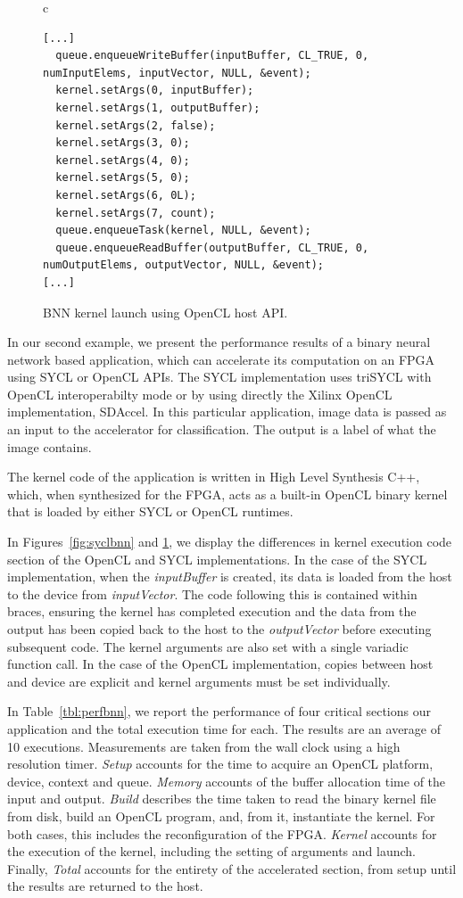 \documentclass[sigplan, review, authordraft]{acmart}
\begin{document}
\begin{figure}
  \begin{tabular}{c}
    \begin{lstlisting}[basicstyle=\scriptsize]
[...]
  queue.enqueueWriteBuffer(inputBuffer, CL_TRUE, 0, numInputElems, inputVector, NULL, &event);
  kernel.setArgs(0, inputBuffer);
  kernel.setArgs(1, outputBuffer);
  kernel.setArgs(2, false);
  kernel.setArgs(3, 0);
  kernel.setArgs(4, 0);
  kernel.setArgs(5, 0);
  kernel.setArgs(6, 0L);
  kernel.setArgs(7, count);
  queue.enqueueTask(kernel, NULL, &event);
  queue.enqueueReadBuffer(outputBuffer, CL_TRUE, 0, numOutputElems, outputVector, NULL, &event);
[...]
\end{lstlisting}
\end{tabular}
\caption{BNN kernel launch using OpenCL host API.}
\label{fig:openclbnn}
\end{figure}


In our second example, we present the performance results of a binary
neural network based application, which can accelerate its computation
on an FPGA using SYCL or OpenCL APIs. The SYCL implementation uses
triSYCL with OpenCL interoperabilty mode or by using directly the Xilinx OpenCL implementation, SDAccel. In this particular application, image data is passed as an input to the accelerator for classification. The output is a label of what the image contains.

The kernel code of the application is written in High Level Synthesis
C++, which, when synthesized for the FPGA, acts as a built-in OpenCL
binary kernel that is loaded by either SYCL or OpenCL runtimes.

In Figures~\ref{fig:syclbnn} and \ref{fig:openclbnn}, we display the differences in kernel execution code section of the OpenCL and SYCL implementations. In the case of the SYCL implementation, when the \textit{inputBuffer} is created, its data is loaded from the host to the device from \textit{inputVector}. The code following this is contained within braces, ensuring the kernel has completed execution and the data from the output has been copied back to the host to the \textit{outputVector} before executing subsequent code. The kernel arguments are also set with a single variadic function call. In the case of the OpenCL implementation, copies between host and device are explicit and kernel arguments must be set individually. 

In Table~\ref{tbl:perfbnn}, we report the performance of four critical sections our application and the total execution time for each. The results are an average of 10 executions. Measurements are taken from the wall clock using a high resolution timer. \textit{Setup} accounts for the time to acquire an OpenCL platform, device, context and queue. \textit{Memory} accounts of the buffer allocation time of the input and output. \textit{Build} describes the time taken to read the binary kernel file from disk, build an OpenCL program, and, from it, instantiate the kernel. For both cases, this includes the reconfiguration of the FPGA. \textit{Kernel} accounts for the execution of the kernel, including the setting of arguments and launch. Finally, \textit{Total} accounts for the entirety of the accelerated section, from setup until the results are returned to the host.
\end{document}
